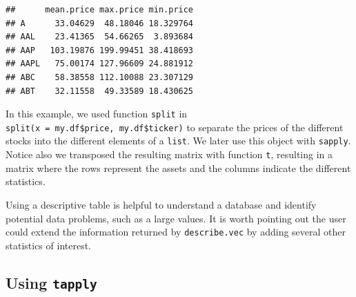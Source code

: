 \documentclass[11pt,]{book}
\newenvironment{Shaded}{\begin{snugshade}}{\end{snugshade}}
\newcommand{\KeywordTok}[1]{\textcolor[rgb]{0.27,0.27,0.27}{\textbf{#1}}}
\newcommand{\DataTypeTok}[1]{\textcolor[rgb]{0.27,0.27,0.27}{#1}}
\newcommand{\StringTok}[1]{\textcolor[rgb]{0.5,0.5,0.5}{#1}}
\newcommand{\CommentTok}[1]{\textcolor[rgb]{0.56,0.35,0.01}{\textit{#1}}}
\newcommand{\OperatorTok}[1]{\textcolor[rgb]{0.81,0.36,0.00}{\textbf{#1}}}
\newcommand{\NormalTok}[1]{#1}
\begin{document}
\begin{Shaded}
\end{Shaded}

\begin{verbatim}
##      mean.price max.price min.price
## A      33.04629  48.18046 18.329764
## AAL    23.41365  54.66265  3.893684
## AAP   103.19876 199.99451 38.418693
## AAPL   75.00174 127.96609 24.881912
## ABC    58.38558 112.10088 23.307129
## ABT    32.11558  49.33589 18.430625
\end{verbatim}

In this example, we used function \texttt{split} in
\texttt{split(x\ =\ my.df\$price,\ my.df\$ticker)} to separate the
prices of the different stocks into the different elements of a
\texttt{list}. We later use this object with \texttt{sapply}. Notice
also we transposed the resulting matrix with function \texttt{t},
resulting in a matrix where the rows represent the assets and the
columns indicate the different statistics. 

Using a descriptive table is helpful to understand a database and
identify potential data problems, such as a large values. It is worth
pointing out the user could extend the information returned by
\texttt{describe.vec} by adding several other statistics of interest.

\subsection{\texorpdfstring{Using
\texttt{tapply}}{Using tapply}}\label{using-tapply}
\end{document}
